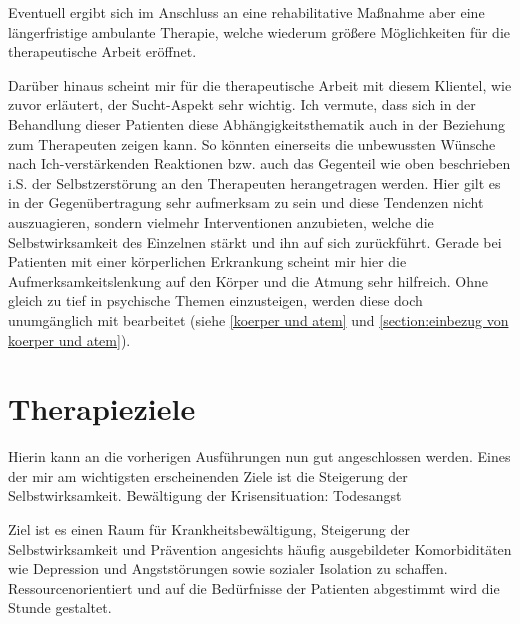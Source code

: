 Eventuell ergibt sich im Anschluss an eine rehabilitative Maßnahme aber eine längerfristige ambulante Therapie, welche wiederum größere Möglichkeiten für die therapeutische Arbeit eröffnet. 

Darüber hinaus scheint mir für die therapeutische Arbeit mit diesem Klientel, wie zuvor erläutert, der Sucht-Aspekt sehr wichtig. Ich vermute, dass sich in der Behandlung dieser Patienten diese Abhängigkeitsthematik auch in der Beziehung zum Therapeuten zeigen kann. So könnten einerseits die unbewussten Wünsche nach Ich-verstärkenden Reaktionen bzw. auch das Gegenteil wie oben beschrieben i.S. der Selbstzerstörung an den Therapeuten herangetragen werden. Hier gilt es in der Gegenübertragung sehr aufmerksam zu sein und diese Tendenzen nicht auszuagieren, sondern vielmehr Interventionen anzubieten, welche die Selbstwirksamkeit des Einzelnen stärkt und ihn auf sich zurückführt. Gerade bei Patienten mit einer körperlichen Erkrankung scheint mir hier die Aufmerksamkeitslenkung auf den Körper und die Atmung sehr hilfreich. Ohne gleich zu tief in psychische Themen einzusteigen, werden diese doch unumgänglich mit bearbeitet (siehe \ref{koerper und atem} und \ref{section:einbezug von koerper und atem}). 

\section{Therapieziele}
Hierin kann an die vorherigen Ausführungen nun gut angeschlossen werden. Eines der mir am wichtigsten erscheinenden Ziele ist die Steigerung der Selbstwirksamkeit. 
Bewältigung der Krisensituation: Todesangst 

Ziel ist es einen Raum für Krankheitsbewältigung, Steigerung der Selbstwirksamkeit und Prävention angesichts häufig ausgebildeter Komorbiditäten wie Depression und Angststörungen sowie sozialer Isolation zu schaffen. Ressourcenorientiert und auf die Bedürfnisse der Patienten abgestimmt wird die Stunde gestaltet.


